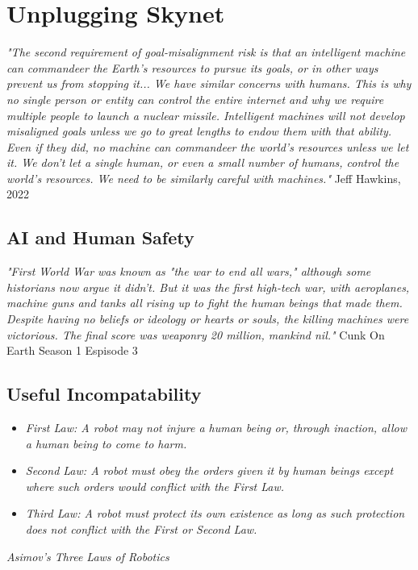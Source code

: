 \setchapterpreamble[u]{\margintoc}
\chapter{Unplugging Skynet}

\textit{"The second requirement of goal-misalignment risk is that an intelligent machine can commandeer the Earth's resources to pursue its goals, or in other ways prevent us from stopping it... We have similar concerns with humans. This is why no single person or entity can control the entire internet and why we require multiple people to launch a nuclear missile. Intelligent machines will not develop misaligned goals unless we go to great lengths to endow them with that ability. Even if they did, no machine can commandeer the world's resources unless we let it. We don't let a single human, or even a small number of humans, control the world's resources. We need to be similarly careful with machines."} Jeff Hawkins, 2022 \cite{hawkins2022}

\section{AI and Human Safety}

\textit{"First World War was known as "the war to end all wars," although some historians now argue it didn't. But it was the first high-tech war, with aeroplanes, machine guns and tanks all rising up to fight the human beings that made them. Despite having no beliefs or ideology or hearts or souls, the killing machines were victorious. The final score was weaponry 20 million, mankind nil."} Cunk On Earth Season 1 Espisode 3 %

\section{Useful Incompatability}

\begin{itemize}
    \item\textit{First Law: A robot may not injure a human being or, through inaction, allow a human being to come to harm.}
    \item\textit{Second Law: A robot must obey the orders given it by human beings except where such orders would conflict with the First Law.}
    \item\textit{Third Law: A robot must protect its own existence as long as such protection does not conflict with the First or Second Law.}
\end{itemize} 
\textit{Asimov's Three Laws of Robotics}

